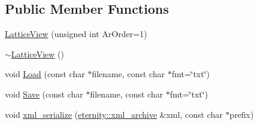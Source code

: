 \subsection*{Public Member Functions}
\begin{DoxyCompactItemize}
\item 
\hyperlink{classtsa_1_1_lattice_view_ab06c208ec07241d525afa95112a49a61}{Lattice\+View} (unsigned int Ar\+Order=1)
\item 
\hyperlink{classtsa_1_1_lattice_view_a2c5158bb8d09c4742906a4eb1c2b8caf}{$\sim$\+Lattice\+View} ()
\item 
void \hyperlink{classtsa_1_1_lattice_view_a4a8f6b4faf4a5c61cbd66aab056e18ab}{Load} (const char $\ast$filename, const char $\ast$fmt=\char`\"{}txt\char`\"{})
\item 
void \hyperlink{classtsa_1_1_lattice_view_a911eefc09c14ed78dee42fffe237ac3a}{Save} (const char $\ast$filename, const char $\ast$fmt=\char`\"{}txt\char`\"{})
\item 
void \hyperlink{classtsa_1_1_lattice_view_a9040c52c4481b0e47346aa39f150c3b2}{xml\+\_\+serialize} (\hyperlink{classeternity_1_1xml__archive}{eternity\+::xml\+\_\+archive} \&xml, const char $\ast$prefix)
\end{DoxyCompactItemize}
